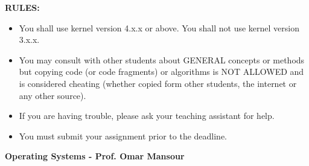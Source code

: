 \documentclass{article}
\begin{document}
\textbf{RULES:}
\begin{itemize}
    \item You shall use kernel version 4.x.x or above. You shall not use kernel version 3.x.x.
    \item You may consult with other students about GENERAL concepts or methods but copying code (or code fragments) or algorithms is NOT ALLOWED and is considered cheating (whether copied form other students, the internet or any other source).
    \item If you are having trouble, please ask your teaching assistant for help.
    \item You must submit your assignment prior to the deadline.
\end{itemize}

\textbf{Operating Systems - Prof. Omar Mansour}
\end{document}
